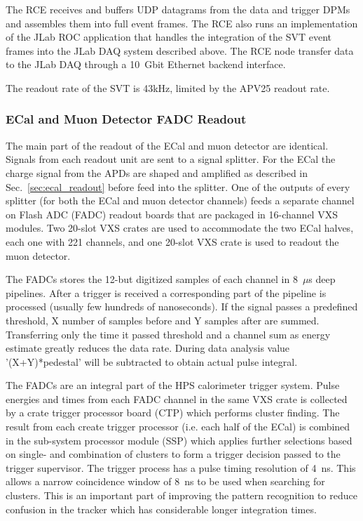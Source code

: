 The RCE receives and buffers UDP datagrams from the data and trigger DPMs and
 assembles them into full event frames. The RCE also runs an implementation of the JLab ROC application that handles the integration of the SVT event frames into the JLab DAQ 
 system described above. The RCE node transfer data to the JLab DAQ  
 through a 10~Gbit Ethernet backend interface. 

The readout rate of the SVT is 43kHz, limited by the APV25 readout rate. 







\subsubsection{ECal and Muon Detector FADC Readout}
\label{sec:fadc_daq}
The main part of the readout of the ECal and muon detector are identical. Signals from each 
readout unit are sent to a signal splitter. For the ECal the charge signal from the APDs are 
shaped and amplified as described in Sec.~\ref{sec:ecal_readout} before feed into the 
splitter. One of the outputs of every splitter (for both the ECal and muon detector channels) 
feeds a separate channel on Flash ADC (FADC) readout boards that are packaged in 
16-channel VXS modules. Two 20-slot VXS crates are used to accommodate the two ECal 
halves, each one with 221 channels, and one 20-slot VXS crate is used to readout the muon 
detector. 

The FADCs stores the 12-but digitized samples of each channel in 8~$\mu$s deep pipelines. 
After a trigger is received a corresponding part of the pipeline is processed (usually few hundreds of nanoseconds). 
If the signal passes a predefined threshold, X number of samples before and Y samples after are summed. Transferring only 
the time it passed threshold and a channel sum as energy estimate greatly reduces the data rate. 
During data analysis value '(X+Y)*pedestal' will be subtracted to obtain actual pulse integral.

The FADCs are an integral part of the HPS calorimeter trigger system. Pulse energies 
and times from each FADC channel in the same VXS crate is collected by a crate trigger
 processor board (CTP) which performs cluster finding. The result from each create trigger processor (i.e. each half of 
the ECal) is combined in the sub-system processor module (SSP) which applies further selections 
based on single- and combination of clusters to form a trigger decision passed to the trigger 
supervisor. The trigger process has a pulse timing resolution of 4~ns. This allows a narrow 
coincidence window of 8~ns to be used when searching for clusters. 
This is an important part of improving 
the pattern recognition to reduce confusion in the tracker which has considerable longer 
integration times. 





